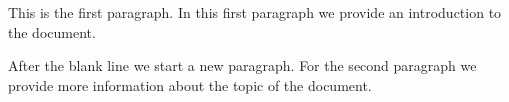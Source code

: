 \documentclass{article}
\begin{document}
This is the first paragraph.
In this first paragraph we provide an introduction to the document.

After the blank line we start a new paragraph. For the second paragraph we
provide more information about the topic of the document.
\end{document}
